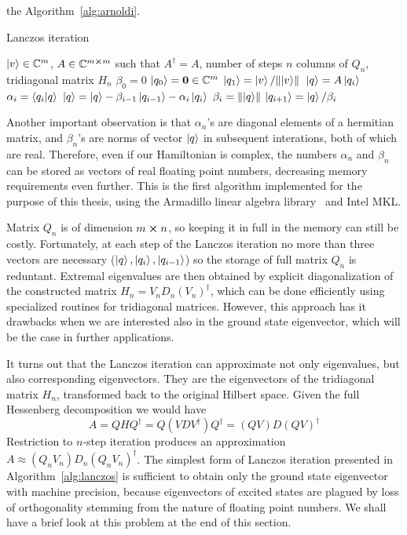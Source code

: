 the Algorithm~\ref{alg:arnoldi}.
\begin{algorithm}
	\algrenewcommand{}
	\algrenewcommand{}
	\caption{Lanczos iteration}
	\label{alg:lanczos}
	\begin{algorithmic}[1]
		\Require  \(\ket{v} \in \mathbb{C}^m\), \(A \in \mathbb{C}^{m\cross m}\) such that \(A^{\dagger} = A\), number of steps \(n\)
		\Ensure columns of \(Q_n\), tridiagonal matrix \(H_n\)
		\State \(\beta_0 = 0\)
		\State \(\ket{q_0} = \vectorbold{0} \in \CC^m\)
		\State \(\ket{q_1} = \ket{v}/\norm*{\ket{v}}\)
			\State \(\ket{q} = A\ket{q_i}\)
			\State \(\alpha_i = \braket{q_i}{q}\)
			\State \(\ket{q} = \ket{q} - \beta_{i-1}\ket{q_{i-1}} - \alpha_i \ket{q_i}\)
			\State \(\beta_i = \norm{\ket{q}} \) 
			\State \(\ket{q_{i+1}} = \ket{q}/\beta_i \)
		\EndFor
	\end{algorithmic}
\end{algorithm}
Another important observation is that \(\alpha_n\)'s are diagonal elements of a hermitian matrix, and \(\beta_n\)'s are
norms of vector \(\ket{q}\) in subsequent interations, both of which are real. Therefore, even if our Hamiltonian is
complex, the numbers \(\alpha_n\) and \(\beta_n\) can be stored as vectors of real floating point numbers, decreasing
memory requirements even further. This is the first algorithm implemented for the purpose of this thesis, using
the Armadillo linear algebra library~\autocite{Sanderson2016} and Intel MKL.

Matrix \(Q_n\) is of dimension \(m \cross n\), so keeping it in full in the memory can still be costly. Fortunately,
at each step of the Lanczos iteration no more than three vectors are necessary (\(\ket{q},\ket{q_i},\ket{q_{i-1}}\))
so the storage of full matrix \(Q_n\) is reduntant. Extremal eigenvalues are then obtained by explicit diagonalization
of the constructed matrix \(H_n = V_n D_n (V_n)^{\dagger}\), which can be done efficiently using specialized routines
for tridiagonal matrices. However, this approach has it drawbacks when we are interested also in the ground state
eigenvector, which will be the case in further applications. 

It turns out that the Lanczos iteration can approximate not only eigenvalues,
but also corresponding eigenvectors. They are the eigenvectors of the tridiagonal matrix \(H_n\), transformed back
to the original Hilbert space. Given the full Hessenberg decomposition we would have
\begin{equation}
	A = Q H Q^{\dagger} = Q (VDV^{\dagger}) Q^{\dagger} = (QV)D(QV)^{\dagger}
	\label{eq:factorization}
\end{equation}
Restriction to \(n\)-step iteration produces an approximation \(A\approx (Q_n V_n)D_n(Q_n V_n)^{\dagger}\).
The simplest form of Lanczos iteration presented in Algorithm~\ref{alg:lanczos} is sufficient to obtain
only the ground state eigenvector with machine precision, because eigenvectors of excited states are plagued
by loss of orthogonality stemming from the nature of floating point numbers. We shall have a brief look at this problem
at the end of this section.

